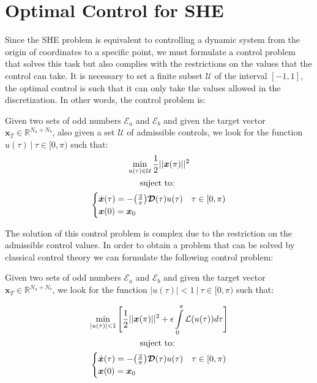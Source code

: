 \section{Optimal Control for SHE}\label{Section4}

Since the SHE problem is equivalent to controlling a dynamic system from the origin of coordinates to a specific point, we must formulate a control problem that solves this task but also complies with the restrictions on the values that the control can take. It is necessary to set a finite subset $ \mathcal {U} $ of the interval $ [- 1,1] $, the optimal control is such that it can only take the values allowed in the discretization. In other words, the control problem is:
\newline
\begin{problem}\label{OCP1}
    Given two sets of odd numbers $ \mathcal {E} _a $ and $ \mathcal {E} _b $ and given the target vector $ \bm {x} _T \in \mathbb {R} ^ {N_a + N_b} $, also given a set $ \mathcal {U} $ of admissible controls, we look for the function $ u (\tau) \ | \ \tau \in [0, \pi) $ such that:
    \begin{gather}
        \min_{u(\tau) \in \mathcal{U}}         
         \frac{1}{2}|| \bm{x}(\pi)  ||^2   \\
        \notag \text{suject to: } \\
        \begin{cases}
            \dot{\bm{x}}(\tau) = -\big(\frac{2}{\pi}\big)\bm{\mathcal{D}}(\tau) u(\tau)  & \tau \in [0,\pi)\\
            \bm{x}(0) = \bm{x}_0
        \end{cases}
    \end{gather}
\end{problem}
%
The solution of this control problem is complex due to the restriction on the admissible control values.
%
In order to obtain a problem that can be solved by classical control theory we can formulate the following control problem:
\newline
\begin{problem}\label{OCP2}
    Given two sets of odd numbers $ \mathcal {E} _a $ and $ \mathcal {E} _b $ and given the target vector $ \bm {x} _T \in \mathbb {R} ^ {N_a + N_b} $, we look for the function $ |u (\tau)|<1 \ | \ \tau \in [0, \pi) $ such that:

    \begin{gather}
        \min_{|u(\tau) |<1}         
         \Bigg[ \frac{1}{2}|| \bm{x}(\pi)  ||^2  
        + \epsilon \int_0^{\pi} \mathcal{L}(u(\tau)) d\tau \Bigg]  \\
        \notag \text{suject to: } \\
        \begin{cases}
            \dot{\bm{x}}(\tau) = -\big(\frac{2}{\pi}\big)\bm{\mathcal{D}}(\tau) u(\tau)  & \tau \in [0,\pi)\\
            \bm{x}(0) = \bm{x}_0
        \end{cases}
    \end{gather}
\end{problem}
